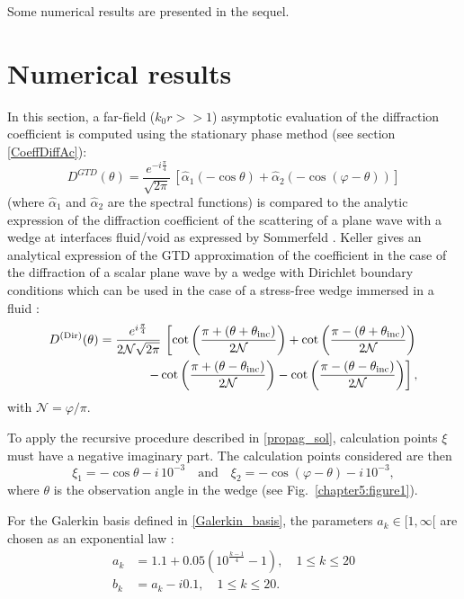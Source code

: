 Some numerical results are presented in the sequel.

\section{Numerical results}
\label{Chapter5:results}

In this section, a far-field ($k_0r>>1$) asymptotic evaluation of the diffraction coefficient is computed using the stationary phase method (see section \ref{CoeffDiffAc}):
\begin{equation*}
D^{GTD}(\theta) = \dfrac{e^{-i\frac{\pi}{4}}}{\sqrt{2\pi}} \, [\hat{\alpha}_1( - \cos \theta) + \hat{\alpha}_2( - \cos ( \varphi - \theta))]
\end{equation*}
(where $\hat{\alpha}_1$ and $\hat{\alpha}_2$ are the spectral functions) is compared to the analytic expression of the diffraction coefficient of the scattering of a plane wave with a wedge at interfaces fluid/void as expressed by Sommerfeld \cite{Sommerfeld}. Keller \cite{GTD} gives an analytical expression of the GTD approximation of the coefficient in the case of the diffraction of a scalar plane wave by a wedge with Dirichlet boundary conditions which can be used in the case of a stress-free wedge immersed in a fluid :
\begin{align}
\label{GTDCoeff_Dir}
D^{\rm (Dir)}(\theta) = \dfrac{e^{i\frac{\pi}{4}}}{2\mathcal{N} \sqrt{2\pi}}  \, \left[ \cot \left( \dfrac{\pi + (\theta + \theta_{\rm inc})}{2\mathcal{N}} \right) + \cot \left( \dfrac{\pi - (\theta + \theta_{\rm inc})}{2\mathcal{N}} \right) \right.   \nonumber \\
\left. - \cot \left( \dfrac{\pi + (\theta - \theta_{\rm inc})}{2\mathcal{N}} \right) - \cot \left( \dfrac{\pi - (\theta - \theta_{\rm inc})}{2\mathcal{N}} \right) \right],
\end{align}
with $\mathcal{N}=\varphi/\pi$.

To apply the recursive procedure described in \ref{propag_sol}, calculation points $\xi$ must have a negative imaginary part. The calculation points considered are then
\begin{equation}
\label{calculation_points_recursive}
\xi_1 = -\cos \theta -i\,10^{-3}  \quad \text{and} \quad \xi_2=- \cos (\varphi - \theta) - i\, 10^{-3} ,
\end{equation}
where $\theta$ is the observation angle in the wedge (see Fig.~\ref{chapter5:figure1}).

For the Galerkin basis defined in \eqref{Galerkin_basis}, the parameters $a_k \in [1,\infty[$ are chosen as an exponential law :
\begin{equation}
\begin{split}
\label{bas_Gal}
a_k &= 1.1 + 0.05 \left( 10^{\frac{k -1}{4}} - 1 \right), \quad 1\leq k\leq 20 \\
b_k &= a_k  - i 0.1, \quad 1\leq k\leq 20 .
\end{split}
\end{equation}

